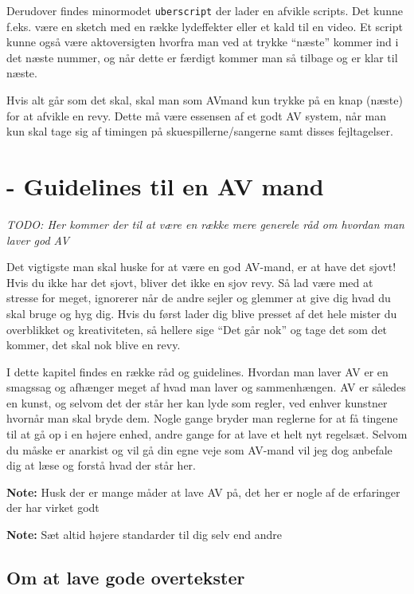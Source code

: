\documentclass[10pt,a4paper,danish]{article}
\newcommand{\note}[1]{\begin{mdframed}[style=note]\textbf{Note:}
    #1\end{mdframed}}
\begin{document}

Derudover findes minormodet \texttt{uberscript} der lader en afvikle scripts.
Det kunne f.eks. være en sketch med en række lydeffekter eller et kald til en video.
Et script kunne også være aktoversigten hvorfra man ved at trykke ``næste''
kommer ind i det næste nummer, og når dette er færdigt kommer man så tilbage og
er klar til næste.

Hvis alt går som det skal, skal man som AVmand kun trykke på en knap (næste) for
at afvikle en revy.
Dette må være essensen af et godt AV system, når man kun skal tage sig af
timingen på skuespillerne/sangerne samt disses fejltagelser.

\section{- Guidelines til en AV mand}


\textit{TODO: Her kommer der til at være en række mere generele råd om hvordan
  man laver god AV}

Det vigtigste man skal huske for at være en god AV-mand, er at have det sjovt!
Hvis du ikke har det sjovt, bliver det ikke en sjov revy.
Så lad være med at stresse for meget, ignorerer når de andre sejler og glemmer
at give dig hvad du skal bruge og hyg dig.
Hvis du først lader dig blive presset af det hele mister du overblikket og
kreativiteten, så hellere sige ``Det går nok'' og tage det som det kommer, det
skal nok blive en revy.

I dette kapitel findes en række råd og guidelines. Hvordan man laver AV er en
smagssag og afhænger meget af hvad man laver og sammenhængen. AV er således en
kunst, og selvom det der står her kan lyde som regler, ved enhver kunstner
hvornår man skal bryde dem. Nogle gange bryder man reglerne for at få tingene
til at gå op i en højere enhed, andre gange for at lave et helt nyt regelsæt.
Selvom du måske er anarkist og vil gå din egne veje som AV-mand vil jeg dog
anbefale dig at læse og forstå hvad der står her.

\note{Husk der er mange måder at lave AV på, det her er nogle af de erfaringer
  der har virket godt}

\note{Sæt altid højere standarder til dig selv end andre}

\subsection{Om at lave gode overtekster}
\end{document}
